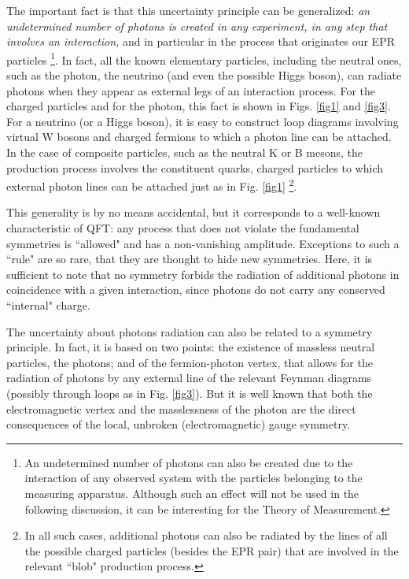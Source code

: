 \documentclass[aps,prl,showkeys,showpacs,preprint,groupedaddress]{revtex4}
\begin{document}
The important fact is that this uncertainty principle can be
generalized: {\it an undetermined number of photons is created in
any experiment, in any step that involves an interaction,} and in
particular in the process that originates our EPR particles
\footnote{An undetermined number of photons can also be created
due to the interaction of any observed system with the particles
belonging to the measuring apparatus. Although such an effect will
not be used in the following discussion, it can be interesting for
the Theory of Measurement.}. In fact, all the known elementary
particles, including the neutral ones, such as the photon, the
neutrino (and even the possible Higgs boson), can radiate photons
when they appear as external legs of an interaction process. For
the charged particles and for the photon, this fact is shown in
Figs. \ref{fig1} and \ref{fig3}. For a neutrino (or a Higgs
boson), it is easy to construct loop diagrams involving virtual W
bosons and charged fermions to which a photon line can be
attached. In the case of composite particles, such as the neutral
K or B mesons, the production process involves the constituent
quarks, charged particles to which external photon lines can be
attached just as in Fig. \ref{fig1} \footnote{In all such cases,
additional photons can also be radiated by the lines of all the
possible charged particles (besides the EPR pair) that are
involved in the relevant ``blob" production process.}.

This generality is by no means accidental, but it corresponds to a
well-known characteristic of QFT: any process that does not
violate the fundamental symmetries is ``allowed" and has a
non-vanishing amplitude. Exceptions to such a ``rule" are so rare,
that they are thought to hide new symmetries. Here, it is
sufficient to note that no symmetry forbids the radiation of
additional photons in coincidence with a given interaction, since
photons do not carry any conserved ``internal" charge.

The uncertainty about photons radiation can also be related to a
symmetry principle. In fact, it is based on two points: the
existence of massless neutral particles, the photons; and of the
fermion-photon vertex, that allows for the radiation of photons by
any external line of the relevant Feynman diagrams (possibly
through loops as in Fig. \ref{fig3}). But it is well known that
both the electromagnetic vertex and the masslessness of the photon
are the direct consequences of the local, unbroken
(electromagnetic) gauge symmetry.
\end{document}
